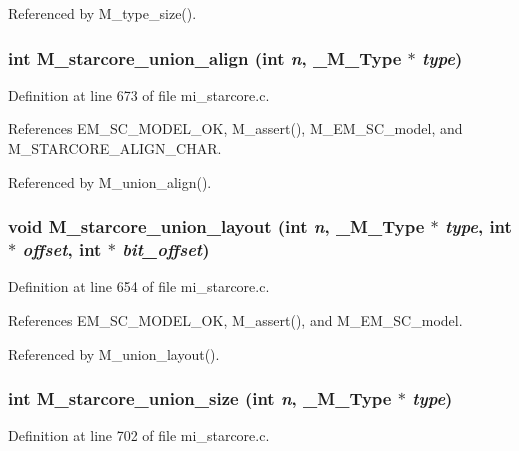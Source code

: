 Referenced by M\_\-type\_\-size().
\subsubsection{\setlength{\rightskip}{0pt plus 5cm}int M\_\-starcore\_\-union\_\-align (int {\em n}, \bf{\_\-M\_\-Type} $\ast$ {\em type})}\label{mi__starcore_8c_e2047a33ad8aa48db4d0d57ede101940}




Definition at line 673 of file mi\_\-starcore.c.

References EM\_\-SC\_\-MODEL\_\-OK, M\_\-assert(), M\_\-EM\_\-SC\_\-model, and M\_\-STARCORE\_\-ALIGN\_\-CHAR.

Referenced by M\_\-union\_\-align().
\subsubsection{\setlength{\rightskip}{0pt plus 5cm}void M\_\-starcore\_\-union\_\-layout (int {\em n}, \bf{\_\-M\_\-Type} $\ast$ {\em type}, int $\ast$ {\em offset}, int $\ast$ {\em bit\_\-offset})}\label{mi__starcore_8c_970da6d97e5dd5f4878097e46cf6e606}




Definition at line 654 of file mi\_\-starcore.c.

References EM\_\-SC\_\-MODEL\_\-OK, M\_\-assert(), and M\_\-EM\_\-SC\_\-model.

Referenced by M\_\-union\_\-layout().
\subsubsection{\setlength{\rightskip}{0pt plus 5cm}int M\_\-starcore\_\-union\_\-size (int {\em n}, \bf{\_\-M\_\-Type} $\ast$ {\em type})}\label{mi__starcore_8c_c47599db6f476890cb500ff2deaddd89}




Definition at line 702 of file mi\_\-starcore.c.

